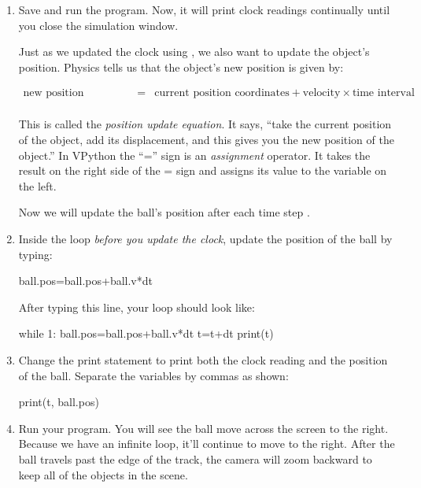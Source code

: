 \begin{enumerate}
\item Save and run the program.  Now, it will print clock readings continually until you close the simulation window.


Just as we updated the clock using , we also want to update the object's position. Physics tells us that the object's new position is given by:

\begin{eqnarray*}
	\mbox{new position coordinates} & = &  \mbox{current position coordinates} + \mbox{velocity} \times \mbox{time interval} \\
\end{eqnarray*}

This is called the \emph{position update equation}. It says, ``take the current position of the object, add its displacement, and this gives you the new position of the object.'' In VPython the ``='' sign is an \emph{assignment} operator. It takes the result on the right side of the = sign and assigns its value to the variable on the left. 

Now we will update the ball's position after each time step .

\item Inside the  loop \emph{before you update the clock}, update the position of the ball by typing:

\begin{myvpython}
	ball.pos=ball.pos+ball.v*dt
\end{myvpython}

After typing this line, your  loop should look like:

\begin{myvpython}
while 1:
	ball.pos=ball.pos+ball.v*dt
	t=t+dt
	print(t)
\end{myvpython}

\item Change the print statement to print both the clock reading and the position of the ball. Separate the variables by commas as shown:

\begin{myvpython}
	print(t, ball.pos)
\end{myvpython}

\item Run your program. You will see the ball move across the screen to the right. Because we have an infinite loop, it'll continue to move to the right. After the ball travels past the edge of the track, the camera will zoom backward to keep all of the objects in the scene.


\end{enumerate}
